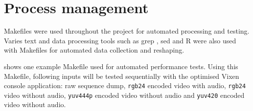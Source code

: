 \section{Process management}

Makefiles \cite{make} were used throughout the project for automated processing and testing. Varies text and data processing tools such as grep \cite{grep}, sed \cite{sed} and R \cite{r_project} were also used with Makefiles for automated data collection and reshaping.

 shows one example Makefile used for automated performance tests. Using this Makefile, following inputs will be tested sequentially with the optimised Vixen console application: raw sequence dump, \texttt{rgb24} encoded video with audio, \texttt{rgb24} video without audio, \texttt{yuv444p} encoded video without audio and \texttt{yuv420} encoded video without audio.
